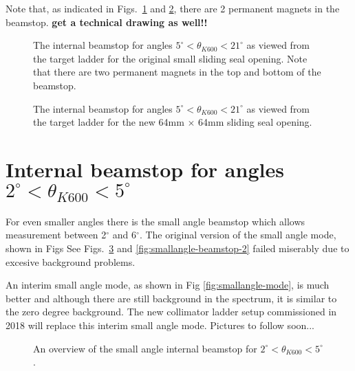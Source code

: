 \documentclass[11pt]{report}
\begin{document}
Note that, as indicated in Figs.~\ref{fig:scatcham-beamstop-smallhole} and 
\ref{fig:scatcham-beamstop-64x64hole}, there are 2 permanent magnets in the
beamstop.
{\bf get a technical drawing as well!! }

\begin{figure}[!ht]
\centerline{\vspace{0cm}\hspace{0cm}
}
\centering
\caption{The internal beamstop for angles $5^{\circ}<\theta_{K600}<21^{\circ}$
 as viewed from the target ladder for the original small sliding seal opening. 
Note that there are two permanent magnets in the top and bottom of the beamstop.}
\label{fig:scatcham-beamstop-smallhole}
\end{figure} 

\begin{figure}[!ht]
\centerline{\vspace{0cm}\hspace{0cm}
}
\centering
\caption{The internal beamstop for angles $5^{\circ}<\theta_{K600}<21^{\circ}$
 as viewed from the target ladder for the new 64mm $\times$ 64mm sliding seal opening. }
\label{fig:scatcham-beamstop-64x64hole}
\end{figure} 


\section{Internal beamstop for angles $2^{\circ}<\theta_{K600}<5^{\circ}$ }

For even smaller angles there is the small angle beamstop which  allows measurement 
between 2$^{\circ}$ and 6$^{\circ}$.  
The original version of the small angle mode, shown in Figs
See Figs.~\ref{fig:smallangle-beamstop-1} and \ref{fig:smallangle-beamstop-2} 
failed miserably due to excesive background problems.

An interim small angle mode, as shown in Fig \ref{fig:smallangle-mode}, 
is much better and although there are still background 
in the spectrum, it is similar to the zero degree background.
The new collimator ladder setup commissioned in 2018 will replace this
interim small angle mode. Pictures to follow soon...


\begin{figure}[!ht]
\centerline{\vspace{0cm}\hspace{0cm}
}
\centering
\caption{An overview of the small angle internal beamstop for $2^{\circ}<\theta_{K600}<5^{\circ}$.}
\label{fig:smallangle-beamstop-1}
\end{figure} 
\end{document}

